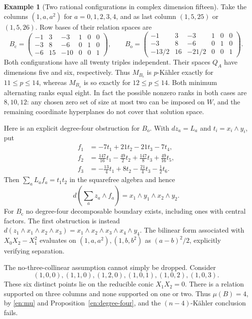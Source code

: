 \documentclass[12pt]{amsart}
\newcommand{\egword}{Example}
\theoremstyle{definition}
\newtheorem{eg}[thm]{\egword}
\theoremstyle{remark}
\numberwithin{equation}{section}
\begin{document}
\begin{eg}[Two rational configurations in complex dimension fifteen]
\label{en:examples}
Take the columns $(1,a,a^2)$ for $a=0,1,2,3,4$, and as last column
$(1,5,25)$ or $(1,5,26)$. Row bases of their relation spaces are
\[
 B_{\mathrm c}=\begin{pmatrix}
 -1&3&-3&1&0&0\\-3&8&-6&0&1&0\\-6&15&-10&0&0&1
 \end{pmatrix},\qquad
 B_{\mathrm o}=\begin{pmatrix}
 -1&3&-3&1&0&0\\-3&8&-6&0&1&0\\-13/2&16&-21/2&0&0&1
 \end{pmatrix}.
\]
Both configurations have all twenty triples independent. Their spaces $Q_A$
have dimensions five and six, respectively. Thus $M_{B_{\mathrm c}}$ is
$p$-K\"ahler exactly for $11\leq p\leq14$, whereas $M_{B_{\mathrm o}}$
is so exactly for $12\leq p\leq14$. Both minimum alternating ranks equal
eight. In fact the possible nonzero ranks in both cases are $8,10,12$:
any chosen zero set of size at most two can be imposed on $W$, and the
remaining coordinate hyperplanes do not cover that solution space.
\end{eg}

Here is an explicit degree-four obstruction for $B_{\mathrm o}$.
With $dz_a=L_a$ and $t_i=x_i\wedge y_i$, put
\begin{align*}
 f_1&=-7t_1+21t_2-21t_3-7t_4,\\
 f_2&=\tfrac{147}{16}t_1-\tfrac{49}{2}t_2
                +\tfrac{147}{8}t_3+\tfrac{49}{16}t_5,\\
 f_3&=-\tfrac{13}{4}t_1+8t_2-\tfrac{21}{4}t_3-\tfrac12t_6.
\end{align*}
Then $\sum_a L_a f_a=t_1t_2$ in the squarefree algebra and hence
\begin{equation}\label{en:explicit-boundary}
 d\left(\sum_a z_a\wedge f_a\right)=x_1\wedge y_1\wedge x_2\wedge y_2.
\end{equation}
For $B_{\mathrm c}$ no degree-four decomposable boundary exists, including
ones with central factors. The first obstruction is instead
$d(z_1\wedge x_1\wedge x_2\wedge x_3)
=x_1\wedge x_2\wedge x_3\wedge x_4\wedge y_4$.
The bilinear form associated with $X_0X_2-X_1^2$ evaluates on
$(1,a,a^2),(1,b,b^2)$ as $(a-b)^2/2$, explicitly verifying separation.

The no-three-collinear assumption cannot simply be dropped. Consider
\[
 (1,0,0),(1,1,0),(1,2,0),(1,0,1),(1,0,2),(1,0,3).
\]
These six distinct points lie on the reducible conic $X_1X_2=0$.
There is a relation supported on three columns and none supported on one
or two. Thus $\mu(B)=4$, by \eqref{en:mu} and
Proposition~\ref{en:degree-four}, and the $(n-4)$-K\"ahler conclusion fails.
\end{document}
